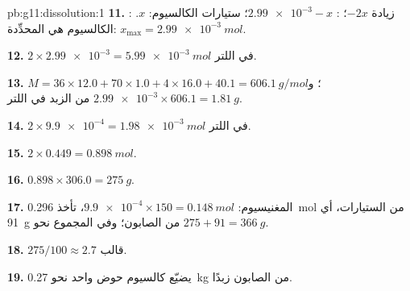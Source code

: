 \begin{solution}{pb:g11:dissolution:1}
\textbf{11.} : زيادة $- 2x$؛ :
$\num{2.99e-3} - x$؛ ستيارات الكالسيوم: $x$.  الكالسيوم هي
المحدِّدة: $x_{\max} = \qty{2.99e-3}{mol}$.

\textbf{12.} $2 \times \num{2.99e-3} = \qty{5.99e-3}{mol}$ في اللتر.

\textbf{13.} $M = 36 \times 12.0 + 70 \times 1.0 + 4 \times 16.0 + 40.1 =
\qty{606.1}{g/mol}$؛ و$\num{2.99e-3} \times 606.1 = \qty{1.81}{g}$ من الزبد
في اللتر.

\textbf{14.} $2 \times \num{9.9e-4} = \qty{1.98e-3}{mol}$ في اللتر.

\textbf{15.} $2 \times 0.449 = \qty{0.898}{mol}$.

\textbf{16.} $0.898 \times 306.0 = \qty{275}{g}$.

\textbf{17.} المغنيسيوم: $\num{9.9e-4} \times 150 = \qty{0.148}{mol}$،
تأخذ \qty{0.296}{mol} من الستيارات، أي \qty{91}{g} من الصابون؛ وفي المجموع
نحو $275 + 91 = \qty{366}{g}$.

\textbf{18.} $275 / 100 \approx 2.7$ قالب.

\textbf{19.} يضيّع كالسيوم حوض واحد نحو \qty{0.27}{kg} من الصابون
زبدًا.
\end{solution}

